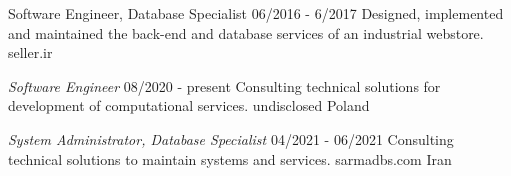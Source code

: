 \documentclass[a4paper,12pt]{memoir} %
\begin{document}

{Software Engineer, Database Specialist}
{06/2016 - 6/2017}
{Designed, implemented and maintained the back-end and database services of an industrial webstore.}
{seller.ir}


\Sep %




{\textit{Software Engineer}}
{08/2020 - present}
{Consulting technical solutions for development of computational services.}
{undisclosed}
{Poland}


{\textit{System Administrator, Database Specialist}}
{04/2021 - 06/2021}
{Consulting technical solutions to maintain systems and services.}
{sarmadbs.com}
{Iran}


\Sep %






\Sep %

\end{document}
